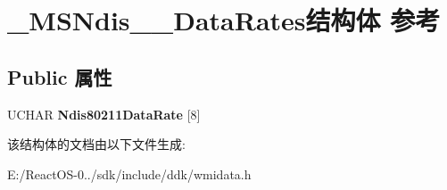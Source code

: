 \hypertarget{struct___m_s_ndis__80211___data_rates}{}\section{\+\_\+\+M\+S\+Ndis\+\_\+\_\+\+Data\+Rates结构体 参考}
\label{struct___m_s_ndis__80211___data_rates}
\subsection*{Public 属性}
\begin{DoxyCompactItemize}
\item 
\mbox{\label{struct___m_s_ndis__80211___data_rates_a2457c78723525a7880a477015b61af59}} 
U\+C\+H\+AR {\bfseries Ndis80211\+Data\+Rate} \mbox{[}8\mbox{]}
\end{DoxyCompactItemize}


该结构体的文档由以下文件生成\+:\begin{DoxyCompactItemize}
\item 
E\+:/\+React\+O\+S-\/0../sdk/include/ddk/wmidata.\+h\end{DoxyCompactItemize}
